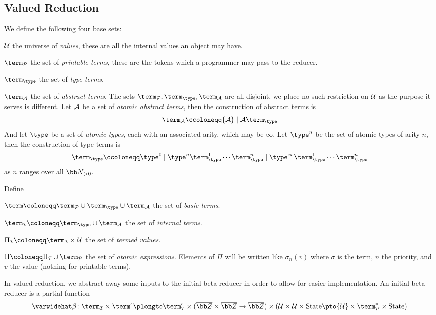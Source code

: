 \subsection{Valued Reduction}

\noindent We define the following four base sets:
\benum
    \item ${\cal U}$ the universe of {\it values}, these are all the internal values an object may have.
    \item $\term_{\cal P}$ the set of {\it printable terms}, these are the tokens which a programmer may pass to the reducer.
    \item $\term_{\type}$ the set of {\it type terms}.
    \item $\term_{\cal A}$ the set of {\it abstract terms}.
\eenum
The sets $\term_{\cal P},\term_\type,\term_{\cal A}$ are all disjoint, we place no such restriction on ${\cal U}$ as the purpose it serves is different.
Let ${\cal A}$ be a set of {\it atomic abstract terms}, then the construction of abstract terms is
$$ \term_{\cal A} \ccoloneqq {\cal A}\mid{\cal A}\term_\type $$
And let $\type$ be a set of {\it atomic types}, each with an associated arity, which may be $\infty$.
Let $\type^n$ be the set of atomic types of arity $n$, then the construction of type terms is
$$ \term_\type \ccoloneqq \type^0 \mid \type^n\term_\type^1\cdots\term_\type^n\mid\type^\infty\term_\type^1\cdots\term_\type^n $$
as $n$ ranges over all ${\bb N}_{>0}$.

Define
\benum
    \item $\term\coloneqq\term_{\cal P}\cup\term_\type\cup\term_{\cal A}$ the set of {\it basic terms}.
    \item $\term_{\cal I}\coloneqq\term_\type\cup\term_{\cal A}$ the set of {\it internal terms}.
    \item $\Pi_{\cal I}\coloneqq\term_{\cal I}\times{\cal U}$ the set of {\it termed values}.
    \item $\Pi\coloneqq\Pi_{\cal I}\cup\term_{\cal P}$ the set of {\it atomic expressions}.
\eenum
Elements of $\overline\Pi$ will be written like $\sigma_n(v)$ where $\sigma$ is the term, $n$ the priority, and $v$ the value (nothing for printable terms).

In valued reduction, we abstract away some inputs to the initial beta-reducer in order to allow for easier implementation.
An initial beta-reducer is a partial function
$$ \varwidehat\beta\colon \term_{\cal I}\times\term^\epsilon\plongto\term_{\cal I}^\epsilon\times(\overline{\bb Z}\times\overline{\bb Z}\to\overline{\bb Z})\times
({\cal U}\times{\cal U}\times{\rm State}\pto{\cal U}\times\term_{\cal P}^*\times{\rm State}) $$

